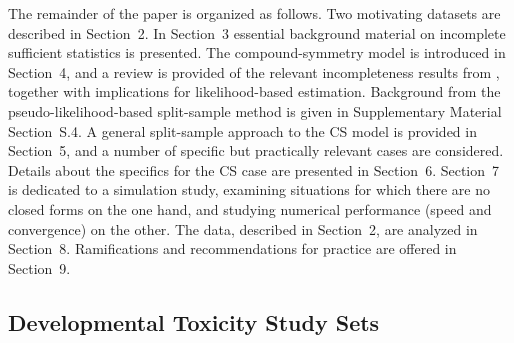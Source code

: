 \documentclass[11pt,a5paper,twoside]{book}
\begin{document}
The remainder of the paper is organized as follows. Two motivating datasets are described in Section~2.
In Section~3
essential background material on incomplete sufficient statistics is presented. The compound-symmetry model is introduced in Section~4,
and a review is provided of the relevant incompleteness results from \cite{Lisa2015_2}, together with implications for likelihood-based estimation. Background from the pseudo-likelihood-based split-sample method is given in Supplementary Material Section~S.4.
A general split-sample approach to the CS model is provided in Section~5,
and a number of specific but practically relevant cases are considered.
Details about the specifics for the CS case are presented in Section~6.
Section~7
 is dedicated to a simulation study, examining situations for which there are no closed forms on the one hand, and studying numerical performance (speed and convergence) on the other. The data, described in Section~2,
are analyzed in Section~8.
Ramifications and recommendations for practice are offered in Section~9.

\subsection{Developmental Toxicity Study Sets}
\label{ntpintro}
\end{document}
